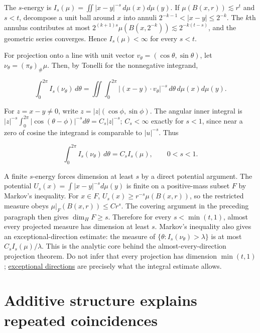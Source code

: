 The \(s\)-energy is \(I_s(\mu)=\iint|x-y|^{-s}\,d\mu(x)d\mu(y)\). If \(\mu(B(x,r))\lesssim r^t\) and \(s<t\), decompose a unit ball around \(x\) into annuli \(2^{-k-1}<|x-y|\le2^{-k}\). The \(k\)th annulus contributes at most \(2^{(k+1)s}\mu(B(x,2^{-k}))\lesssim2^{-k(t-s)}\), and the geometric series converges. Hence \(I_s(\mu)<\infty\) for every \(s<t\).

For projection onto a line with unit vector \(v_\theta=(\cos\theta,\sin\theta)\), let \(\nu_\theta=(\pi_\theta)_\#\mu\). Then, by Tonelli for the nonnegative integrand,

\[\int_0^{2\pi}I_s(\nu_\theta)\,d\theta
=\iint\int_0^{2\pi}|(x-y)\cdot v_\theta|^{-s}\,d\theta\,d\mu(x)d\mu(y).\]

For \(z=x-y\ne0\), write \(z=|z|(\cos\phi,\sin\phi)\). The angular inner integral is \(|z|^{-s}\int_0^{2\pi}|\cos(\theta-\phi)|^{-s}d\theta=C_s|z|^{-s}\); \(C_s<\infty\) exactly for \(s<1\), since near a zero of cosine the integrand is comparable to \(|u|^{-s}\). Thus

\[\int_0^{2\pi}I_s(\nu_\theta)\,d\theta=C_s I_s(\mu),\qquad 0<s<1.\]

A finite \(s\)-energy forces dimension at least \(s\) by a direct potential argument. The potential \(U_s(x)=\int|x-y|^{-s}d\mu(y)\) is finite on a positive-mass subset \(F\) by Markov's inequality. For \(x\in F\), \(U_s(x)\ge r^{-s}\mu(B(x,r))\), so the restricted measure obeys \(\mu|_F(B(x,r))\le Cr^s\). The covering argument in the preceding paragraph then gives \(\dim_H F\ge s\). Therefore for every \(s<\min(t,1)\), almost every projected measure has dimension at least \(s\). Markov's inequality also gives an exceptional-direction estimate: the measure of \(\{\theta:I_s(\nu_\theta)>\lambda\}\) is at most \(C_s I_s(\mu)/\lambda\). This is the analytic core behind the almost-every-direction projection theorem. Do not infer that every projection has dimension \(\min(t,1)\); \hyperref[appendix-3c73f7862157]{exceptional directions} are precisely what the integral estimate allows.

\section{Additive structure explains repeated coincidences}\label{04-visual-computing-ii-ch033-additive-structure-explains-repeated-coincidences}

\hypertarget{04-visual-computing-ii-ch033-additive-structure-explains-repeated-coincidences}{}

